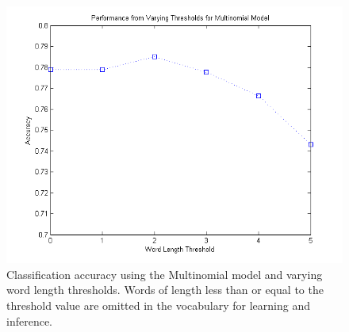 \documentclass[12pt]{article}
\begin{document}
\begin{figure}[!t]
  \centering
  \includegraphics[scale=.60]{img/vocabthreshold_multi.png}
  \caption{Classification accuracy using the Multinomial model and varying word length thresholds. Words of length less than or equal to the threshold value are omitted in the vocabulary for learning and inference.}
  \label{fig:vocabthreshold_multi}
\end{figure}
\end{document}

